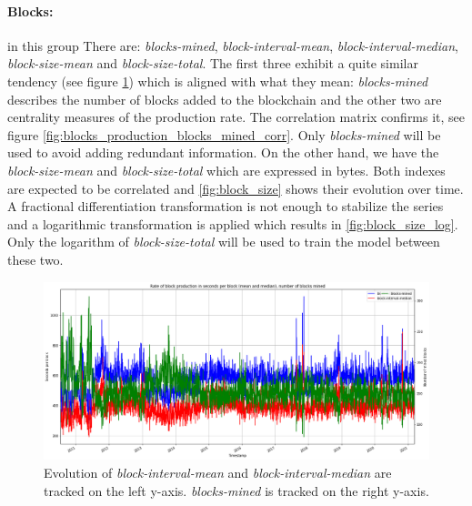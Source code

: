 \paragraph{Blocks:} in this group There are: \emph{blocks-mined},
\emph{block-interval-mean}, \emph{block-interval-median}, \emph{block-size-mean}
and \emph{block-size-total}. The first three exhibit a quite similar tendency
(see figure \ref{fig:blocks_produced_blocks_mined}) which is aligned with what
they mean: \emph{blocks-mined} describes the number of blocks added to the
blockchain and the other two are centrality measures of the production rate. The
correlation matrix confirms it, see figure \ref{fig:blocks_production_blocks_mined_corr}.
Only \emph{blocks-mined} will be used to avoid adding redundant information.
On the other hand, we have the \emph{block-size-mean} and
\emph{block-size-total} which are expressed in bytes. Both indexes are expected
to be correlated and \ref{fig:block_size} shows their evolution over time. A
fractional differentiation transformation is not enough to stabilize the series
and a logarithmic transformation is applied which results in
\ref{fig:block_size_log}. Only the logarithm of \emph{block-size-total} will be
used to train the model between these two.

\begin{figure}[H]
    \centering
    \includegraphics[width=\textwidth]{methods/images/block_production_blocks_mined.png}
    \caption{Evolution of \emph{block-interval-mean} and \emph{block-interval-median} are tracked on the left y-axis. \emph{blocks-mined} is tracked on the right y-axis.}
    \label{fig:blocks_produced_blocks_mined}
\end{figure}

